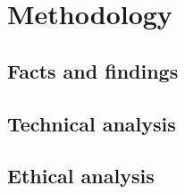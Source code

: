 \chapter{Methodology}

\section{Facts and findings}

\section{Technical analysis}

\section{Ethical analysis}